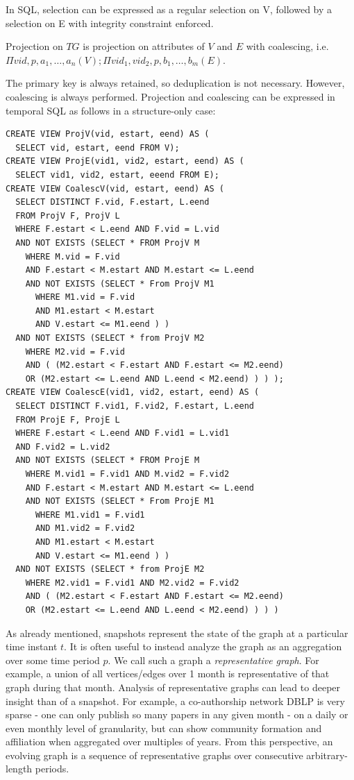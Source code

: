 In SQL, selection can be expressed as a regular selection on V, followed by a selection on E with integrity constraint enforced.

\begin{definition}[Projection]
Projection on $TG$ is projection on attributes of $V$ and $E$ with
coalescing, i.e. \\$\Pi vid, p, a_1, \ldots, a_n(V); \Pi vid_1, vid_2,
p, b_1, \ldots, b_m(E)$. 
\label{def:projection}
\end{definition}

The primary key is always retained, so deduplication is not necessary.
However, coalescing is always performed.  Projection and coalescing
can be expressed in temporal SQL as follows in a structure-only case:

\begin{small}
\begin{verbatim}
CREATE VIEW ProjV(vid, estart, eend) AS (
  SELECT vid, estart, eend FROM V);
CREATE VIEW ProjE(vid1, vid2, estart, eend) AS (
  SELECT vid1, vid2, estart, eeend FROM E);
CREATE VIEW CoalescV(vid, estart, eend) AS (
  SELECT DISTINCT F.vid, F.estart, L.eend
  FROM ProjV F, ProjV L
  WHERE F.estart < L.eend AND F.vid = L.vid
  AND NOT EXISTS (SELECT * FROM ProjV M
    WHERE M.vid = F.vid
    AND F.estart < M.estart AND M.estart <= L.eend
    AND NOT EXISTS (SELECT * From ProjV M1
      WHERE M1.vid = F.vid
      AND M1.estart < M.estart
      AND V.estart <= M1.eend ) )
  AND NOT EXISTS (SELECT * from ProjV M2
    WHERE M2.vid = F.vid
    AND ( (M2.estart < F.estart AND F.estart <= M2.eend)
    OR (M2.estart <= L.eend AND L.eend < M2.eend) ) ) );
CREATE VIEW CoalescE(vid1, vid2, estart, eend) AS (
  SELECT DISTINCT F.vid1, F.vid2, F.estart, L.eend
  FROM ProjE F, ProjE L
  WHERE F.estart < L.eend AND F.vid1 = L.vid1 
  AND F.vid2 = L.vid2
  AND NOT EXISTS (SELECT * FROM ProjE M
    WHERE M.vid1 = F.vid1 AND M.vid2 = F.vid2
    AND F.estart < M.estart AND M.estart <= L.eend
    AND NOT EXISTS (SELECT * From ProjE M1
      WHERE M1.vid1 = F.vid1
      AND M1.vid2 = F.vid2
      AND M1.estart < M.estart
      AND V.estart <= M1.eend ) )
  AND NOT EXISTS (SELECT * from ProjE M2
    WHERE M2.vid1 = F.vid1 AND M2.vid2 = F.vid2
    AND ( (M2.estart < F.estart AND F.estart <= M2.eend)
    OR (M2.estart <= L.eend AND L.eend < M2.eend) ) ) )
\end{verbatim}
\end{small}

As already mentioned, snapshots represent the state of the graph at a
particular time instant $t$.  It is often useful to instead analyze
the graph as an aggregation over some time period $p$.  We call such a
graph a {\em representative graph}.  For example, a union of all
vertices/edges over 1 month is representative of that graph during
that month.  Analysis of representative graphs can lead to deeper
insight than of a snapshot.  For example, a co-authorship network DBLP
is very sparse - one can only publish so many papers in any given
month - on a daily or even monthly level of granularity, but can show
community formation and affiliation when aggregated over multiples of
years.  From this perspective, an evolving graph is a sequence of
representative graphs over consecutive arbitrary-length periods.

